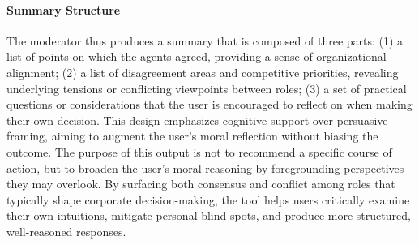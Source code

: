 \paragraph{Summary Structure}
The moderator thus produces a summary that is composed of three parts: (1) a list of points on which the agents agreed, providing a sense of organizational alignment; (2) a list of disagreement areas and competitive priorities, revealing underlying tensions or conflicting viewpoints between roles; (3) a set of practical questions or considerations that the user is encouraged to reflect on when making their own decision.
This design emphasizes cognitive support over persuasive framing, aiming to augment the user's moral reflection without biasing the outcome.
The purpose of this output is not to recommend a specific course of action, but to broaden the user's moral reasoning by foregrounding perspectives they may overlook. By surfacing both consensus and conflict among roles that typically shape corporate decision-making, the tool helps users critically examine their own intuitions, mitigate personal blind spots, and produce more structured, well-reasoned responses.

